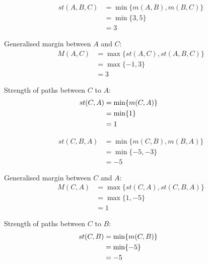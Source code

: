 \begin{align}
st (A, B, C)&= \min \lbrace m (A, B), m (B, C) \rbrace  \nonumber \\
                     &= \min \lbrace 3, 5 \rbrace \nonumber \\
                     &= 3\nonumber
\end{align}

\noindent
Generalised margin between $A$ and $C$:
\begin{align}
M (A, C)&=  \max \lbrace st (A, C), st(A, B, C) \rbrace \nonumber \\
                     &= \max \lbrace -1, 3 \rbrace \nonumber \\
                     &= 3\nonumber
\end{align}

\noident
Strength of paths between $C$ to $A$:
\begin{align}
\hspace{-3cm} st (C, A)&=  \min \lbrace m (C, A) \rbrace  \nonumber \\
					  &= \min \lbrace 1 \rbrace  \nonumber \\
                     &= 1 \nonumber
\end{align}


\begin{align}
st (C, B, A)&= \min \lbrace m (C, B), m (B, A) \rbrace  \nonumber \\
                     &= \min \lbrace -5, -3 \rbrace \nonumber \\
                     &= -5\nonumber
\end{align}

\noindent
Generalised margin between $C$ and $A$:
\begin{align}
M (C, A)&=  \max \lbrace st (C, A), st(C, B, A) \rbrace \nonumber \\
                     &= \max \lbrace 1, -5 \rbrace \nonumber \\
                     &= 1\nonumber
\end{align}




\noident
Strength of paths between $C$ to $B$:
\begin{align}
\hspace{-3cm} st (C, B)&=  \min \lbrace m (C, B) \rbrace  \nonumber \\
					  &= \min \lbrace -5 \rbrace  \nonumber \\
                     &= -5 \nonumber
\end{align}


